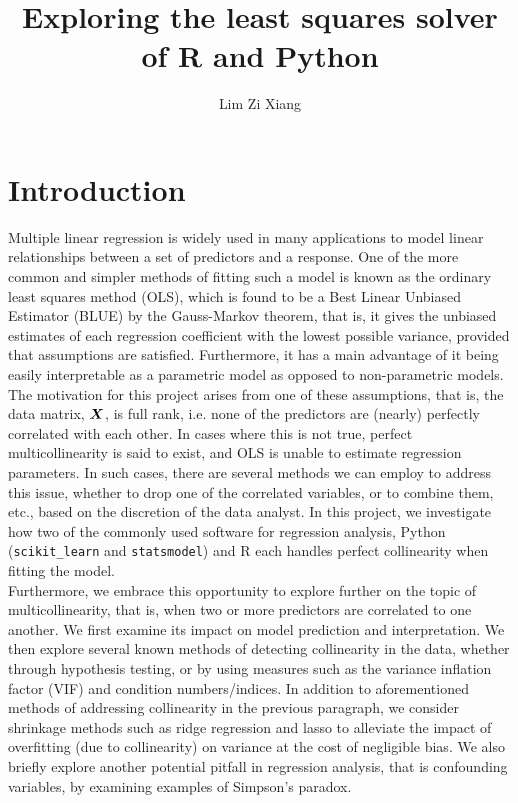 \documentclass[12pt]{article}
\title{Exploring the least squares solver of R and Python}
\author{Lim Zi Xiang}
\date{}
\begin{document}
	\tableofcontents
	\pagebreak
	
	\section{Introduction}
	
	Multiple linear regression is widely used in many applications to model linear relationships between a set of predictors and a response. One of the more common and simpler methods of fitting such a model is known as the ordinary least squares method (OLS), which is found to be a Best Linear Unbiased Estimator (BLUE) by the Gauss-Markov theorem, that is, it gives the unbiased estimates of each regression coefficient with the lowest possible variance, provided that assumptions are satisfied. Furthermore, it has a main advantage of it being easily interpretable as a parametric model as opposed to non-parametric models.\\
	
	\setlength\parindent{24pt} The motivation for this project arises from one of these assumptions, that is, the data matrix, $\boldsymbol{X}$, is full rank, i.e. none of the predictors are (nearly) perfectly correlated with each other. In cases where this is not true, perfect multicollinearity is said to exist, and OLS is unable to estimate regression parameters. In such cases, there are several methods we can employ to address this issue, whether to drop one of the correlated variables, or to combine them, etc., based on the discretion of the data analyst. In this project, we investigate how two of the commonly used software for regression analysis, Python (\texttt{scikit\_learn} and \texttt{statsmodel}) and R each handles perfect collinearity when fitting the model.\\
	
	Furthermore, we embrace this opportunity to explore further on the topic of multicollinearity, that is, when two or more predictors are correlated to one another.\cite{McClave2018} We first examine its impact on model prediction and interpretation. We then explore several known methods of detecting collinearity in the data, whether through hypothesis testing, or by using measures such as the variance inflation factor (VIF) and condition numbers/indices. In addition to aforementioned methods of addressing collinearity in the previous paragraph, we consider shrinkage methods such as ridge regression and lasso to alleviate the impact of overfitting (due to collinearity) on variance at the cost of negligible bias. We also briefly explore another potential pitfall in regression analysis, that is confounding variables, by examining examples of Simpson's paradox.\\
	
\end{document}
